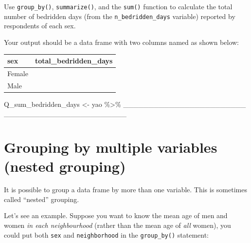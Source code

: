 \documentclass[
  letterpaper,
  DIV=11,
  numbers=noendperiod]{scrreprt}
\newenvironment{Shaded}{\begin{snugshade}}{\end{snugshade}}
\newcommand{\NormalTok}[1]{\textcolor[rgb]{0.00,0.23,0.31}{#1}}
\newcommand{\OtherTok}[1]{\textcolor[rgb]{0.00,0.23,0.31}{#1}}
\newcommand{\SpecialCharTok}[1]{\textcolor[rgb]{0.37,0.37,0.37}{#1}}
\begin{document}
\begin{tcolorbox}[enhanced jigsaw, title=\textcolor{quarto-callout-tip-color}{\faLightbulb}\hspace{0.5em}{Practice}, colbacktitle=quarto-callout-tip-color!10!white, leftrule=.75mm, arc=.35mm, opacityback=0, bottomrule=.15mm, rightrule=.15mm, toptitle=1mm, breakable, toprule=.15mm, colback=white, coltitle=black, colframe=quarto-callout-tip-color-frame, bottomtitle=1mm, titlerule=0mm, left=2mm, opacitybacktitle=0.6]

Use \texttt{group\_by()}, \texttt{summarize()}, and the \texttt{sum()}
function to calculate the total number of bedridden days (from the
\texttt{n\_bedridden\_days} variable) reported by respondents of each
sex.

Your output should be a data frame with two columns named as shown
below:

\begin{longtable}[]{@{}ll@{}}
\toprule\noalign{}
sex & total\_bedridden\_days \\
\midrule\noalign{}
\endhead
\bottomrule\noalign{}
\endlastfoot
Female & \\
Male & \\
\end{longtable}

\begin{Shaded}
\begin{Highlighting}[]
\NormalTok{Q\_sum\_bedridden\_days }\OtherTok{\textless{}{-}} 
\NormalTok{  yao }\SpecialCharTok{\%\textgreater{}\%} 
\NormalTok{  \_\_\_\_\_\_\_\_\_\_\_\_\_\_\_\_\_\_\_\_\_\_\_\_}
\NormalTok{  \_\_\_\_\_\_\_\_\_\_\_\_\_\_\_\_\_\_\_\_\_\_\_\_}
\end{Highlighting}
\end{Shaded}

\end{tcolorbox}

\section{Grouping by multiple variables (nested
grouping)}\label{grouping-by-multiple-variables-nested-grouping}

It is possible to group a data frame by more than one variable. This is
sometimes called ``nested'' grouping.

Let's see an example. Suppose you want to know the mean age of men and
women \emph{in each neighbourhood} (rather than the mean age of
\emph{all} women), you could put both \texttt{sex} and
\texttt{neighborhood} in the \texttt{group\_by()} statement:
\end{document}
